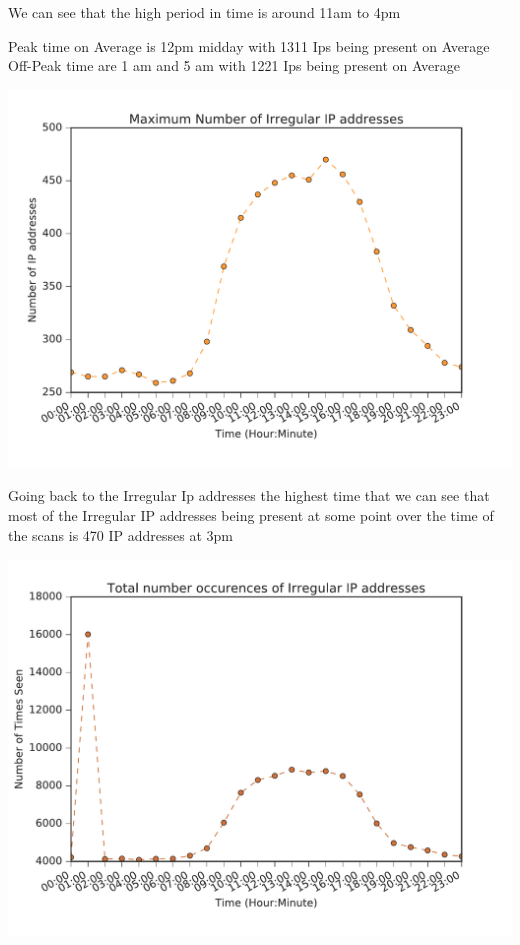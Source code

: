 \documentclass[a4wide,leqno,12pt]{report}
\begin{document}
We can see that the high period in time is around 11am to 4pm

Peak time on Average is 12pm midday with 1311 Ips being present on Average
Off-Peak time are 1 am and 5 am with 1221 Ips being present on Average 

\begin{center}
\includegraphics[scale=.5]{pdf_images/MaximumNumberOfIrregularIPaddressesInAnAverageDay}
\end{center}
Going back to the Irregular Ip addresses the highest time that we can see that most of the Irregular IP addresses being present at some point over the time of the scans is 470 IP addresses at 3pm

\begin{center}
\includegraphics[scale=.5]{pdf_images/TotalNumberOccurencesOfIrregularIPaddressesOnAverage}
\end{center}
\end{document}
